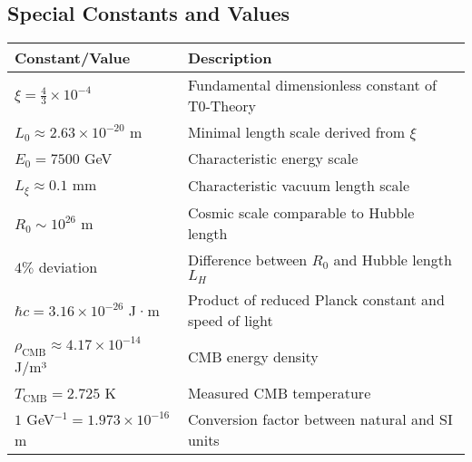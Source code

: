 \documentclass[12pt,a4paper]{article}
\numberwithin{equation}{section}
\begin{document}
\subsection*{Special Constants and Values}

\begin{longtable}{p{4cm} p{10cm}}
	\toprule
	\textbf{Constant/Value} & \textbf{Description} \\
	\midrule
	\endhead
	
	$\xi = \frac{4}{3} \times 10^{-4}$ & Fundamental dimensionless constant of T0-Theory \\
	$L_0 \approx 2.63 \times 10^{-20}$ m & Minimal length scale derived from $\xi$ \\
	$E_0 = 7500$ GeV & Characteristic energy scale \\
	$L_\xi \approx 0.1$ mm & Characteristic vacuum length scale \\
	$R_0 \sim 10^{26}$ m & Cosmic scale comparable to Hubble length \\
	$4\%$ deviation & Difference between $R_0$ and Hubble length $L_H$ \\
	$\hbar c = 3.16 \times 10^{-26}$ J·m & Product of reduced Planck constant and speed of light \\
	$\rho_{\text{CMB}} \approx 4.17 \times 10^{-14}$ J/m³ & CMB energy density \\
	$T_{\text{CMB}} = 2.725$ K & Measured CMB temperature \\
	$1$ GeV$^{-1} = 1.973 \times 10^{-16}$ m & Conversion factor between natural and SI units \\
	\bottomrule
\end{longtable}
	
\end{document}
